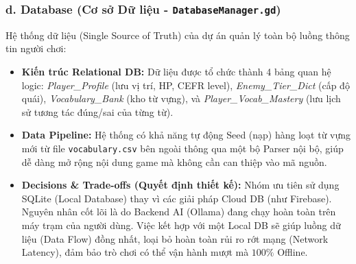 \subsubsection*{d. Database (Cơ sở Dữ liệu - \texttt{DatabaseManager.gd})}
Hệ thống dữ liệu (Single Source of Truth) của dự án quản lý toàn bộ luồng thông tin người chơi:
\begin{itemize}
    \item \textbf{Kiến trúc Relational DB:} Dữ liệu được tổ chức thành 4 bảng quan hệ logic: \textit{Player\_Profile} (lưu vị trí, HP, CEFR level), \textit{Enemy\_Tier\_Dict} (cấp độ quái), \textit{Vocabulary\_Bank} (kho từ vựng), và \textit{Player\_Vocab\_Mastery} (lưu lịch sử tương tác đúng/sai của từng từ).
    \item \textbf{Data Pipeline:} Hệ thống có khả năng tự động Seed (nạp) hàng loạt từ vựng mới từ file \texttt{vocabulary.csv} bên ngoài thông qua một bộ Parser nội bộ, giúp dễ dàng mở rộng nội dung game mà không cần can thiệp vào mã nguồn.
    \item \textbf{Decisions \& Trade-offs (Quyết định thiết kế):} Nhóm ưu tiên sử dụng SQLite (Local Database) thay vì các giải pháp Cloud DB (như Firebase). Nguyên nhân cốt lõi là do Backend AI (Ollama) đang chạy hoàn toàn trên máy trạm của người dùng. Việc kết hợp với một Local DB sẽ giúp luồng dữ liệu (Data Flow) đồng nhất, loại bỏ hoàn toàn rủi ro rớt mạng (Network Latency), đảm bảo trò chơi có thể vận hành mượt mà $100\%$ Offline.
\end{itemize}